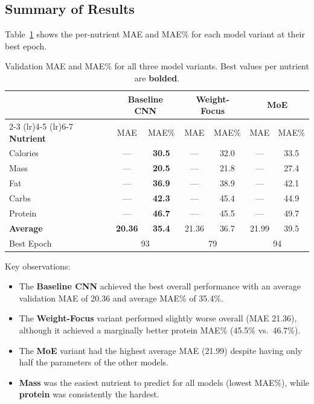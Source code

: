 \documentclass[11pt,a4paper]{article}
\begin{document}
\subsection{Summary of Results}

Table~\ref{tab:results} shows the per-nutrient MAE and MAE\% for each model variant at their best epoch.

\begin{table}[H]
\centering
\caption{Validation MAE and MAE\% for all three model variants. Best values per nutrient are \textbf{bolded}.}
\label{tab:results}
\begin{tabular}{@{}l cc cc cc@{}}
\toprule
& \multicolumn{2}{c}{\textbf{Baseline CNN}} & \multicolumn{2}{c}{\textbf{Weight-Focus}} & \multicolumn{2}{c}{\textbf{MoE}} \\
\cmidrule(lr){2-3} \cmidrule(lr){4-5} \cmidrule(lr){6-7}
\textbf{Nutrient} & MAE & MAE\% & MAE & MAE\% & MAE & MAE\% \\
\midrule
Calories  & ---   & \textbf{30.5}  & ---   & 32.0  & ---   & 33.5  \\
Mass      & ---   & \textbf{20.5}  & ---   & 21.8  & ---   & 27.4  \\
Fat       & ---   & \textbf{36.9}  & ---   & 38.9  & ---   & 42.1  \\
Carbs     & ---   & \textbf{42.3}  & ---   & 45.4  & ---   & 44.9  \\
Protein   & ---   & \textbf{46.7}  & ---   & 45.5  & ---   & 49.7  \\
\midrule
\textbf{Average} & \textbf{20.36} & \textbf{35.4} & 21.36 & 36.7 & 21.99 & 39.5 \\
Best Epoch & \multicolumn{2}{c}{93} & \multicolumn{2}{c}{79} & \multicolumn{2}{c}{94} \\
\bottomrule
\end{tabular}
\end{table}

Key observations:
\begin{itemize}
  \item The \textbf{Baseline CNN} achieved the best overall performance with an average validation MAE of 20.36 and average MAE\% of 35.4\%.
  \item The \textbf{Weight-Focus} variant performed slightly worse overall (MAE 21.36), although it achieved a marginally better protein MAE\% (45.5\% vs.\ 46.7\%).
  \item The \textbf{MoE} variant had the highest average MAE (21.99) despite having only half the parameters of the other models.
  \item \textbf{Mass} was the easiest nutrient to predict for all models (lowest MAE\%), while \textbf{protein} was consistently the hardest.
\end{itemize}
\end{document}
